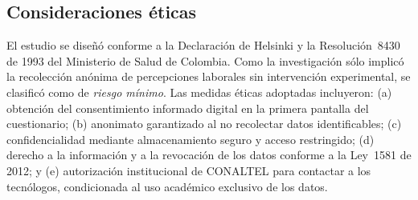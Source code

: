 \subsection*{Consideraciones éticas}
El estudio se diseñó conforme a la Declaración de Helsinki y la Resolución 8430 de 1993 del Ministerio de Salud de Colombia. Como la investigación sólo implicó la recolección anónima de percepciones laborales sin intervención experimental, se clasificó como de \emph{riesgo mínimo}. Las medidas éticas adoptadas incluyeron: (a) obtención del consentimiento informado digital en la primera pantalla del cuestionario; (b) anonimato garantizado al no recolectar datos identificables; (c) confidencialidad mediante almacenamiento seguro y acceso restringido; (d) derecho a la información y a la revocación de los datos conforme a la Ley 1581 de 2012; y (e) autorización institucional de CONALTEL para contactar a los tecnólogos, condicionada al uso académico exclusivo de los datos.
